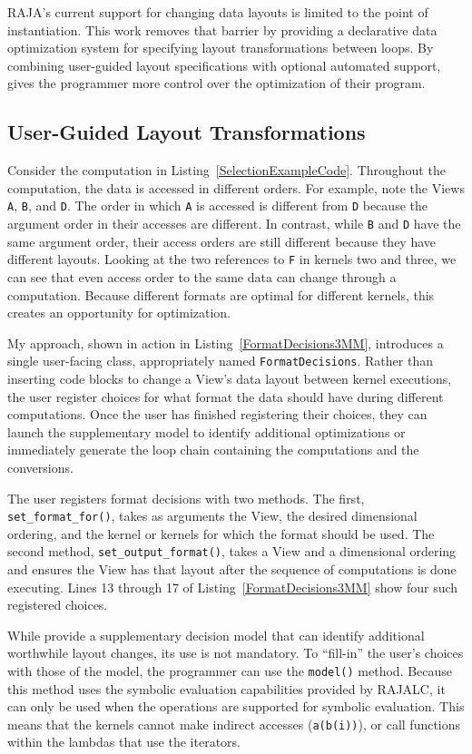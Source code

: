 RAJA's current support for changing data layouts is limited to the point of instantiation.
This work removes that barrier by providing a declarative data optimization system for specifying layout transformations between loops.
By combining user-guided layout specifications with optional automated support, \FormatDecisions{} gives the programmer more control over the optimization of their program.

\subsection{User-Guided Layout Transformations}

Consider the computation in Listing~\ref{SelectionExampleCode}.
Throughout the computation, the data is accessed in different orders.
For example, note the Views \verb.A., \verb.B., and \verb.D..
The order in which \verb.A. is accessed is different from \verb.D. because the argument order in their accesses are different.
In contrast, while \verb.B. and \verb.D. have the same argument order, their access orders are still different because they have different layouts.
Looking at the two references to \verb.F. in kernels two and three, we can see that even access order to the same data can change through a computation.
Because different formats are optimal for different kernels, this creates an opportunity for optimization. 

My approach, shown in action in Listing~\ref{FormatDecisions3MM}, introduces a single user-facing class, appropriately named \verb.FormatDecisions..
Rather than inserting code blocks to change a View's data layout between kernel executions, the user register choices for what format the data should have during different computations. 
Once the user has finished registering their choices, they can launch the supplementary model to identify additional optimizations or immediately generate the loop chain containing the computations and the conversions.

The user registers format decisions with two methods.
The first, \verb.set_format_for()., takes as arguments the View, the desired dimensional ordering, and the kernel or kernels for which the format should be used.
The second method, \verb.set_output_format()., takes a View and a dimensional ordering and ensures the View has that layout after the sequence of computations is done executing.
Lines 13 through 17 of Listing~\ref{FormatDecisions3MM} show four such registered choices.

While \FormatDecisions{} provide a supplementary decision model that can identify additional worthwhile layout changes, its use is not mandatory.
To ``fill-in'' the user's choices with those of the model, the programmer can use the \verb.model(). method.
Because this method uses the symbolic evaluation capabilities provided by RAJALC, it can only be used when the operations are supported for symbolic evaluation.
This means that the kernels cannot make indirect accesses (\verb.a(b(i)).), or call functions within the lambdas that use the iterators.

